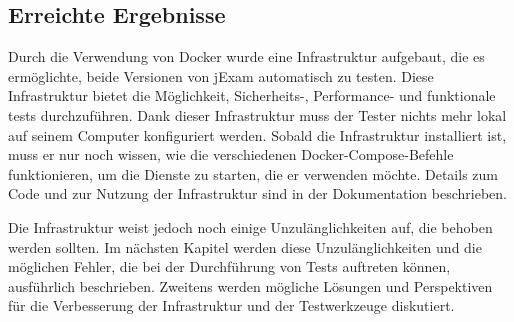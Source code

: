 \subsection{Erreichte Ergebnisse}

Durch die Verwendung von Docker wurde eine Infrastruktur aufgebaut,
die es ermöglichte, beide Versionen von jExam automatisch zu testen.
Diese Infrastruktur bietet die Möglichkeit, Sicherheits-,
Performance- und funktionale tests durchzuführen. Dank dieser
Infrastruktur muss der Tester nichts mehr lokal auf seinem
Computer konfiguriert werden. Sobald die Infrastruktur installiert
ist, muss er nur noch wissen, wie die verschiedenen
Docker-Compose-Befehle funktionieren, um die Dienste zu starten,
die er verwenden möchte. Details zum Code und zur Nutzung der
Infrastruktur sind in der Dokumentation beschrieben.

Die Infrastruktur weist jedoch noch einige Unzulänglichkeiten auf,
die behoben werden sollten. Im nächsten Kapitel werden diese
Unzulänglichkeiten und die möglichen Fehler, die bei der Durchführung
von Tests auftreten können, ausführlich beschrieben. Zweitens
werden mögliche Lösungen und Perspektiven für die Verbesserung der
Infrastruktur und der Testwerkzeuge diskutiert.
